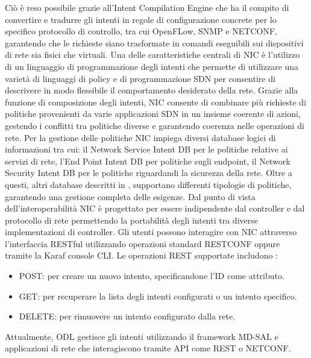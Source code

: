Ciò è reso possibile grazie all'Intent Compilation Engine che ha il compito di convertire e tradurre gli intenti in regole di configurazione concrete per lo specifico protocollo di controllo, tra cui OpenFLow, SNMP e NETCONF,
garantendo che le richieste siano trasformate in comandi eseguibili sui dispositivi di rete sia fisici che virtuali.
\newline Una delle caratteristiche centrali di NIC è l'utilizzo di un linguaggio di programmazione degli intenti che permette di utilizzare una varietà di linguaggi di policy e di programmazione SDN
per consentire di descrivere in modo flessibile il comportamento desiderato della rete. %
\newline Grazie alla funzione di composizione degli intenti, NIC consente di combinare più richieste di politiche provenienti da varie applicazioni SDN in un insieme coerente di azioni,
gestendo i conflitti tra politiche diverse e garantendo coerenza nelle operazioni di rete.
\newline Per la gestione delle politiche NIC impiega diversi database logici di informazioni tra cui: il Network Service Intent DB per le politiche relative ai servizi di rete,
l'End Point Intent DB per politiche sugli endpoint, il Network Security Intent DB per le politiche riguardandi la sicurezza della rete.
Oltre a questi, altri database descritti in \cite{NICProposal}, supportano differenti tipologie di politiche, garantendo una gestione completa delle esigenze.
\newline Dal punto di vista dell'interoperabilità NIC è progettato per essere indipendente dal controller e dal protocollo di rete 
permettendo la portabilità degli intenti tra diverse implementazioni di controller.
Gli utenti possono interagire con NIC attraverso l'interfaccia RESTful utilizzando operazioni standard RESTCONF oppure tramite la Karaf console CLI.
\newline Le operazioni REST supportate includono \cite{nic}:
\begin{itemize}
    \item POST: per creare un nuovo intento, specificandone l'ID come attributo.
    \item GET: per recuperare la lista degli intenti configurati o un intento specifico.
    \item DELETE: per rimuovere un intento configurato dalla rete.
\end{itemize}
Attualmente, ODL gestisce gli intenti utilizzando il framework MD-SAL e applicazioni di rete che interagiscono tramite API come REST o NETCONF.
